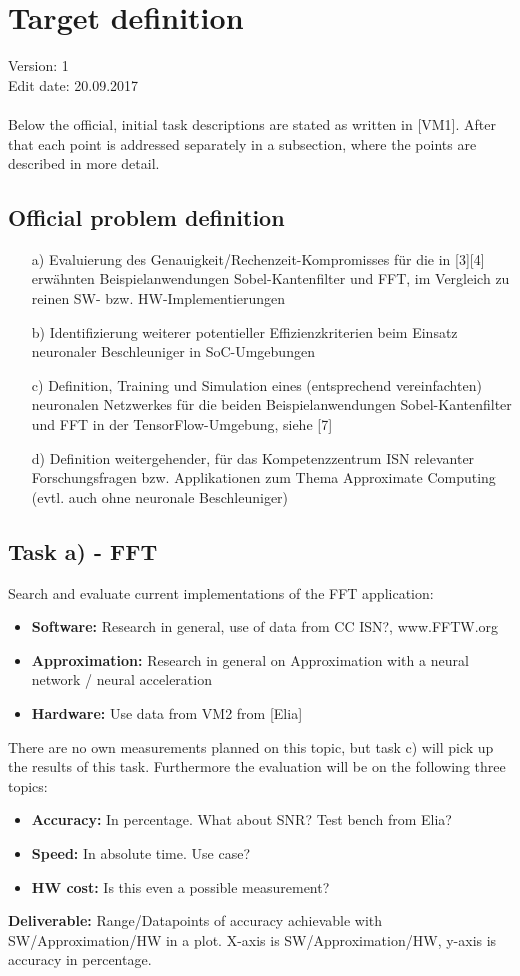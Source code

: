 \section*{Target definition}
Version: 1 \\
Edit date: 20.09.2017 \\ \\
Below the official, initial task descriptions are stated as written in [VM1]. After that each point is addressed separately in a subsection, where the points are described in more detail.

\subsection*{Official problem definition}
\begin{itemize}
	\item[a)] Evaluierung des Genauigkeit/Rechenzeit-Kompromisses für die in [3][4] erwähnten Beispielanwendungen Sobel-Kantenfilter und FFT, im Vergleich zu reinen SW- bzw. HW-Implementierungen
	\item[b)] Identifizierung weiterer potentieller Effizienzkriterien beim Einsatz neuronaler Beschleuniger in SoC-Umgebungen
	\item[c)] Definition, Training und Simulation eines (entsprechend vereinfachten) neuronalen Netzwerkes für die beiden Beispielanwendungen Sobel-Kantenfilter und FFT in der TensorFlow-Umgebung, siehe [7]
	\item[d)] Definition weitergehender, für das Kompetenzzentrum ISN relevanter Forschungsfragen bzw. Applikationen zum Thema Approximate Computing (evtl. auch ohne neuronale Beschleuniger)
\end{itemize}

\subsection*{Task a) - FFT}
Search and evaluate current implementations of the FFT application:
\begin{itemize}
	\item \textbf{Software:} Research in general, use of data from CC ISN?, www.FFTW.org
	\item \textbf{Approximation:} Research in general on Approximation with a neural network / neural acceleration
	\item \textbf{Hardware:} Use data from VM2 from [Elia]
\end{itemize}
There are no own measurements planned on this topic, but task c) will pick up the results of this task. Furthermore the evaluation will be on the following three topics:
\begin{itemize}
	\item \textbf{Accuracy:} In percentage. What about SNR? Test bench from Elia?
	\item \textbf{Speed:} In absolute time. Use case?
	\item \textbf{HW cost:} Is this even a possible measurement?
\end{itemize}
\textbf{Deliverable:} Range/Datapoints of accuracy achievable with SW/Approximation/HW in a plot. X-axis is SW/Approximation/HW, y-axis is accuracy in percentage.

